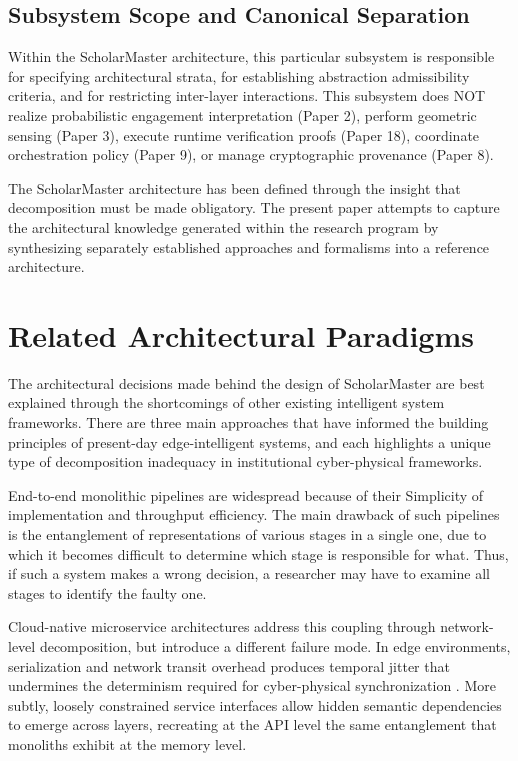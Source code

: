 \documentclass[conference]{IEEEtran}
\begin{document}
\subsection{Subsystem Scope and Canonical Separation}
Within the ScholarMaster architecture, this particular subsystem is responsible for specifying architectural strata, for establishing abstraction admissibility criteria, and for restricting inter-layer interactions. This subsystem does NOT realize probabilistic engagement interpretation (Paper 2), perform geometric sensing (Paper 3), execute runtime verification proofs (Paper 18), coordinate orchestration policy (Paper 9), or manage cryptographic provenance (Paper 8).

The ScholarMaster architecture has been defined through the insight that decomposition must be made obligatory. The present paper attempts to capture the architectural knowledge generated within the research program by synthesizing separately established approaches and formalisms into a reference architecture.

\section{Related Architectural Paradigms}
The architectural decisions made behind the design of ScholarMaster are best explained through the shortcomings of other existing intelligent system frameworks. There are three main approaches that have informed the building principles of present-day edge-intelligent systems, and each highlights a unique type of decomposition inadequacy in institutional cyber-physical frameworks.

End-to-end monolithic pipelines \cite{b7} are widespread because of their Simplicity of implementation and throughput efficiency. The main drawback of such pipelines is the entanglement of representations of various stages in a single one, due to which it becomes difficult to determine which stage is responsible for what. Thus, if such a system makes a wrong decision, a researcher may have to examine all stages to identify the faulty one.

Cloud-native microservice architectures \cite{b4, b14} address this coupling through network-level decomposition, but introduce a different failure mode. In edge environments, serialization and network transit overhead produces temporal jitter that undermines the determinism required for cyber-physical synchronization \cite{b19}. More subtly, loosely constrained service interfaces allow hidden semantic dependencies to emerge across layers, recreating at the API level the same entanglement that monoliths exhibit at the memory level.
\end{document}
